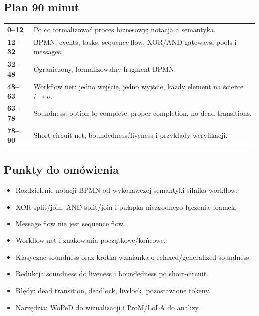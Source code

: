 \documentclass[11pt,a4paper]{article}
\begin{document}
\subsection{Plan 90 minut}
\begin{center}\small\begin{tabularx}{0.96\textwidth}{@{}>{\bfseries}p{18mm}X@{}}
0--12 & Po co formalizować proces biznesowy; notacja a semantyka.\\
12--32 & BPMN: events, tasks, sequence flow, XOR/AND gateways, pools i messages.\\
32--48 & Ograniczony, formalizowalny fragment BPMN.\\
48--63 & Workflow net: jedno wejście, jedno wyjście, każdy element na ścieżce $i\to o$.\\
63--78 & Soundness: option to complete, proper completion, no dead transitions.\\
78--90 & Short-circuit net, boundedness/liveness i przykłady weryfikacji.\\
\end{tabularx}\end{center}

\subsection{Punkty do omówienia}
\begin{itemize}
\item Rozdzielenie notacji BPMN od wykonawczej semantyki silnika workflow.
\item XOR split/join, AND split/join i pułapka niezgodnego łączenia bramek.
\item Message flow nie jest sequence flow.
\item Workflow net i znakowania początkowe/końcowe.
\item Klasyczne soundness oraz krótka wzmianka o relaxed/generalized soundness.
\item Redukcja soundness do liveness i boundedness po short-circuit.
\item Błędy: dead transition, deadlock, livelock, pozostawione tokeny.
\item Narzędzia: WoPeD do wizualizacji i ProM/LoLA do analizy.
\end{itemize}
\end{document}
